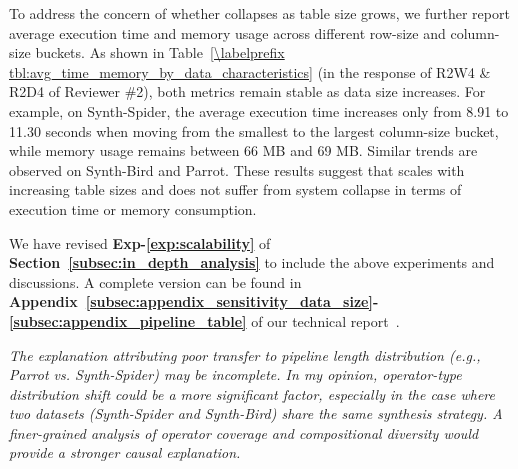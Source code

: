 To address the concern of whether \sys collapses as table size grows, we further report average execution time and memory usage across different row-size and column-size buckets. As shown in Table~\ref{\labelprefix tbl:avg_time_memory_by_data_characteristics} (in the response of R2W4 \& R2D4 of Reviewer \#2), both metrics remain stable as data size increases. For example, on Synth-Spider, the average execution time increases only from 8.91 to 11.30 seconds when moving from the smallest to the largest column-size bucket, while memory usage remains between 66 MB and 69 MB. Similar trends are observed on Synth-Bird and Parrot. These results suggest that \sys scales with increasing table sizes and does not suffer from system collapse in terms of execution time or memory consumption.


{We have revised \textbf{Exp-\ref{exp:scalability}} of \textbf{Section~\ref{subsec:in_depth_analysis}} to include the above experiments and discussions.} A complete version can be found in \textbf{Appendix~\ref{subsec:appendix_sensitivity_data_size}-\ref{subsec:appendix_pipeline_table}} of our technical report~\cite{technical_report}.


\begin{shaded}
{
\emph{The explanation attributing poor transfer to pipeline length distribution (e.g., Parrot vs. Synth-Spider) may be incomplete. In my opinion, operator-type distribution shift could be a more significant factor, especially in the case where two datasets (Synth-Spider and Synth-Bird) share the same synthesis strategy. A finer-grained analysis of operator coverage and compositional diversity would provide a stronger causal explanation.}
}
\end{shaded}

